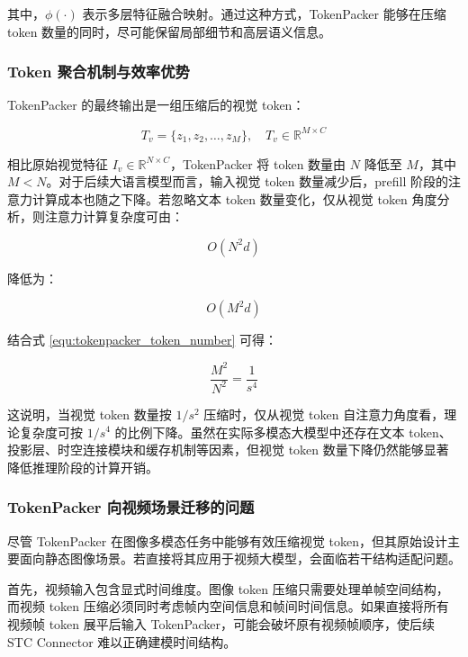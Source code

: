 其中，$\phi(\cdot)$ 表示多层特征融合映射。通过这种方式，TokenPacker 能够在压缩 token 数量的同时，尽可能保留局部细节和高层语义信息。

\subsubsection{Token 聚合机制与效率优势}

TokenPacker 的最终输出是一组压缩后的视觉 token：

\begin{equation}
    \label{equ:tokenpacker_output}
    T_v=\{z_1,z_2,\dots,z_M\},\quad T_v\in\mathbb{R}^{M\times C}
\end{equation}

相比原始视觉特征 $I_v\in\mathbb{R}^{N\times C}$，TokenPacker 将 token 数量由 $N$ 降低至 $M$，其中 $M<N$。对于后续大语言模型而言，输入视觉 token 数量减少后，prefill 阶段的注意力计算成本也随之下降。若忽略文本 token 数量变化，仅从视觉 token 角度分析，则注意力计算复杂度可由：

\begin{equation}
    \label{equ:before_compression_complexity}
    O(N^2d)
\end{equation}

降低为：

\begin{equation}
    \label{equ:after_compression_complexity}
    O(M^2d)
\end{equation}

结合式 \ref{equ:tokenpacker_token_number} 可得：

\begin{equation}
    \label{equ:complexity_ratio}
    \frac{M^2}{N^2}=\frac{1}{s^4}
\end{equation}

这说明，当视觉 token 数量按 $1/s^2$ 压缩时，仅从视觉 token 自注意力角度看，理论复杂度可按 $1/s^4$ 的比例下降。虽然在实际多模态大模型中还存在文本 token、投影层、时空连接模块和缓存机制等因素，但视觉 token 数量下降仍然能够显著降低推理阶段的计算开销。

\subsubsection{TokenPacker 向视频场景迁移的问题}

尽管 TokenPacker 在图像多模态任务中能够有效压缩视觉 token，但其原始设计主要面向静态图像场景。若直接将其应用于视频大模型，会面临若干结构适配问题。

首先，视频输入包含显式时间维度。图像 token 压缩只需要处理单帧空间结构，而视频 token 压缩必须同时考虑帧内空间信息和帧间时间信息。如果直接将所有视频帧 token 展平后输入 TokenPacker，可能会破坏原有视频帧顺序，使后续 STC Connector 难以正确建模时间结构。

